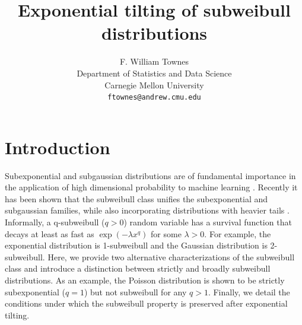 \documentclass{article}
\theoremstyle{definition}
\begin{document}
\title{Exponential tilting of subweibull distributions}
\author{F. William Townes\\
        Department of Statistics and Data Science\\
        Carnegie Mellon University\\
        \texttt{ftownes@andrew.cmu.edu}
        }


\maketitle

\tableofcontents

\section{Introduction}

Subexponential and subgaussian distributions are of fundamental importance in the application of high dimensional probability to machine learning \cite{vershyninHighDimensionalProbabilityIntroduction2018,wainwrightHighDimensionalStatisticsNonAsymptotic2019}. Recently it has been shown that the subweibull class unifies the subexponential and subgaussian families, while also incorporating distributions with heavier tails \cite{vladimirovaSubWeibullDistributionsGeneralizing2020,kuchibhotlaMovingSubGaussianityHighdimensional2022}. Informally, a q-subweibull ($q>0$) random variable has a survival function that decays at least as fast as $\exp(-\lambda x^q)$ for some $\lambda>0$. For example, the exponential distribution is 1-subweibull and the Gaussian distribution is 2-subweibull. Here, we provide two alternative characterizations of the subweibull class and introduce a distinction between strictly and broadly subweibull distributions. As an example, the Poisson distribution is shown to be strictly subexponential ($q=1$) but not subweibull for any $q>1$. Finally, we detail the conditions under which the subweibull property is preserved after exponential tilting.
\end{document}
